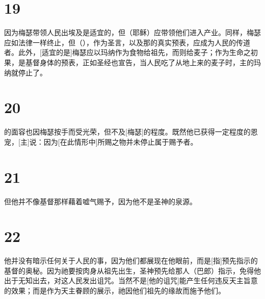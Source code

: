 \section{19}

因为梅瑟带领人民出埃及是适宜的，但（耶稣）应带领他们进入产业。同样，梅瑟应如法律一样终止，但（），作为圣言，以及那的真实预表，应成为人民的传道者。此外，[适宜的是]梅瑟应以玛纳作为食物给祖先，而则给麦子；作为生命之初果，是基督身体的预表，正如圣经也宣告，当人民吃了从地上来的麦子时，主的玛纳就停止了。\par


\section{20}

的面容也因梅瑟按手而受光荣，但不及[梅瑟]的程度。既然他已获得一定程度的恩宠，[主]说：因为[在此情形中]所赐之物并未停止属于赐予者。\par


\section{21}

但他并不像基督那样藉着嘘气赐予，因为他不是圣神的泉源。\par


\section{22}

  他并没有暗示任何关于人民的事，因为他们都展现在他眼前，而是[指]预先指示的基督的奥秘。因为祂要按肉身从祖先出生，圣神预先给那人（巴郎）指示，免得他出于无知出去，对这人民发出诅咒。当然不是[他的诅咒]能产生任何违反天主旨意的效果；而是作为天主眷顾的展示，祂因他们祖先的缘故而施予他们。\par

